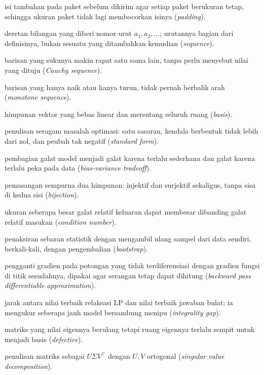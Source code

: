 \begin{description}[style=nextline,itemsep=0.35em]
  \item[Bantalan] isi tambahan pada paket sebelum dikirim agar setiap paket berukuran tetap, sehingga ukuran paket tidak lagi membocorkan isinya (\emph{padding}).
  \item[Barisan] deretan bilangan yang diberi nomor urut $a_1,a_2,\dots$; urutannya bagian dari definisinya, bukan sesuatu yang ditambahkan kemudian (\emph{sequence}).
  \item[Barisan Cauchy] barisan yang sukunya makin rapat satu sama lain, tanpa perlu menyebut nilai yang dituju (\emph{Cauchy sequence}).
  \item[Barisan monoton] barisan yang hanya naik atau hanya turun, tidak pernah berbalik arah (\emph{monotone sequence}).
  \item[Basis] himpunan vektor yang bebas linear dan merentang seluruh ruang (\emph{basis}).
  \item[Bentuk baku] penulisan seragam masalah optimasi: satu sasaran, kendala berbentuk tidak lebih dari nol, dan peubah tak negatif (\emph{standard form}).
  \item[Bias-variansi] pembagian galat model menjadi galat karena terlalu sederhana dan galat karena terlalu peka pada data (\emph{bias-variance tradeoff}).
  \item[Bijeksi] pemasangan sempurna dua himpunan: injektif dan surjektif sekaligus, tanpa sisa di kedua sisi (\emph{bijection}).
  \item[Bilangan kondisi] ukuran seberapa besar galat relatif keluaran dapat membesar dibanding galat relatif masukan (\emph{condition number}).
  \item[Bootstrap] penaksiran sebaran statistik dengan mengambil ulang sampel dari data sendiri, berkali-kali, dengan pengembalian (\emph{bootstrap}).
  \item[BPDA] pengganti gradien pada potongan yang tidak terdiferensiasi dengan gradien fungsi di titik sesudahnya, dipakai agar serangan tetap dapat dihitung (\emph{backward pass differentiable approximation}).
  \item[Celah integralitas] jarak antara nilai terbaik relaksasi LP dan nilai terbaik jawaban bulat; ia mengukur seberapa jauh model bersambung menipu (\emph{integrality gap}).
  \item[Defective] matriks yang nilai eigennya berulang tetapi ruang eigennya terlalu sempit untuk menjadi basis (\emph{defective}).
  \item[Dekomposisi nilai singular (SVD)] penulisan matriks sebagai $U\Sigma V^{\top}$ dengan $U,V$ ortogonal (\emph{singular value decomposition}).

\end{description}
